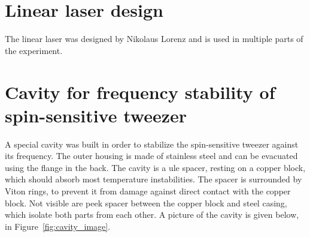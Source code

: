 \appendix
\chapter{Linear laser design}%
\label{ch:linear_laser}

The linear laser was designed by Nikolaus Lorenz and is used in multiple parts of the experiment.

\begin{figure}[h!]%
\end{figure}

\chapter{Cavity for frequency stability of spin-sensitive tweezer}%
\label{ch:app_cavity}

A special cavity was built in order to stabilize the spin-sensitive tweezer against its frequency. The outer housing is made of stainless steel and can be evacuated using the flange in the back. The cavity is a \ac{ule} spacer, resting on a copper block, which should absorb most temperature instabilities. The spacer is surrounded by Viton rings, to prevent it from damage against direct contact with the copper block. Not visible are peek spacer between the copper block and steel casing, which isolate both parts from each other. A picture of the cavity is given below, in Figure~\ref{fig:cavity_image}.

